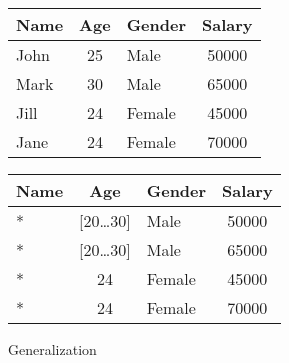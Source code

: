 \begin{figure}[H]
    \centering
    \begin{tabular}{l c l c}
        \toprule
        \textbf{Name} & \textbf{Age} & \textbf{Gender} & \textbf{Salary} \\
        \midrule
        John & 25 & Male   & 50000 \\
        Mark & 30 & Male   & 65000 \\
        Jill & 24 & Female & 45000 \\
        Jane & 24 & Female & 70000 \\
        \bottomrule
    \end{tabular}
    \quad
    \begin{tabular}{l c l c}
        \toprule
        \textbf{Name} & \textbf{Age} & \textbf{Gender} & \textbf{Salary} \\
        \midrule
        * & [20\ldots30] & Male   & 50000 \\
        * & [20\ldots30] & Male   & 65000 \\
        * & 24      & Female & 45000 \\
        * & 24      & Female & 70000 \\
        \bottomrule
    \end{tabular}
    \caption{Generalization}\label{fig:generalization}
\end{figure}